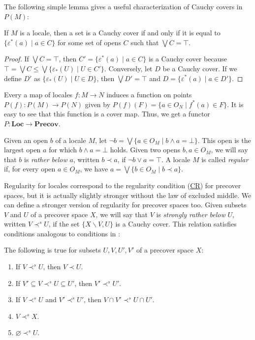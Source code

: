 \documentclass[reqno]{amsart}
\newcommand{\axref}[1]{(\hyperref[ax:#1]{#1})}
\theoremstyle{definition}
\theoremstyle{remark}
\numberwithin{figure}{section}
\newcommand{\rb}{\prec}
\newcommand{\cat}[1]{\mathbf{#1}}
\begin{document}
The following simple lemma gives a useful characterization of Cauchy covers in $P(M)$:

\begin{lem}
If $M$ is a locale, then a set is a Cauchy cover if and only if it is equal to $\{ \varepsilon^*(a) \mid a \in C \}$ for some set of opens $C$ such that $\bigvee C = \top$.
\end{lem}
\begin{proof}
If $\bigvee C = \top$, then $C' = \{ \varepsilon^*(a) \mid a \in C \}$ is a Cauchy cover because $\top = \bigvee C \leq \bigvee \{ \varepsilon_*(U) \mid U \in C' \}$.
Conversely, let $D$ be a Cauchy cover.
If we define $D'$ as $\{ \varepsilon_*(U) \mid U \in D \}$, then $\bigvee D' = \top$ and $D = \{ \varepsilon^*(a) \mid a \in D' \}$.
\end{proof}

Every a map of locales $f : M \to N$ induces a function on points $P(f) : P(M) \to P(N)$ given by $P(f)(F) = \{ a \in O_N \mid f^*(a) \in F \}$.
It is easy to see that this function is a cover map.
Thus, we get a functor $P : \cat{Loc} \to \cat{Precov}$.

Given an open $b$ of a locale $M$, let $\neg b = \bigvee \{ a \in O_M \mid b \wedge a = \bot \}$.
This open is the largest open $a$ for which $b \wedge a = \bot$ holds.
Given two opens $b,a \in O_M$, we will say that $b$ is \emph{rather below} $a$, written $b \rb a$, if $\neg b \vee a = \top$.
A locale $M$ is called \emph{regular} if, for every open $a \in O_M$, we have $a = \bigvee \{ b \in O_M \mid b \rb a \}$.

Regularity for locales correspond to the regularity condition \axref{CR} for precover spaces, but it is actually slightly stronger without the law of excluded middle.
We can define a stronger version of regularity for precover spaces too.
Given subsets $V$ and $U$ of a precover space $X$, we will say that $V$ is \emph{strongly rather below} $U$, written $V \rb^s U$, if the set $\{ X \backslash V, U \}$ is a Cauchy cover.
This relation satisfies conditions analogous to conditions in :

\begin{prop}
The following is true for subsets $U,V,U',V'$ of a precover space $X$:
\begin{enumerate}
\item If $V \rb^s U$, then $V \rb U$.
\item If $V' \subseteq V \rb^s U \subseteq U'$, then $V' \rb^s U'$.
\item If $V \rb^s U$ and $V' \rb^s U'$, then $V \cap V' \rb^s U \cap U'$.
\item $V \rb^s X$.
\item $\varnothing \rb^s U$.
\end{enumerate}
\end{prop}
\end{document}

